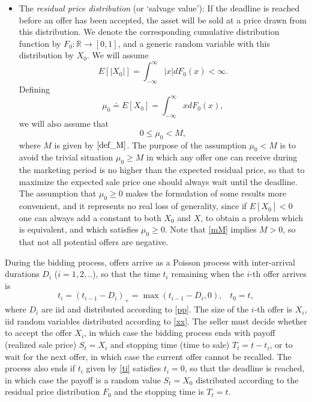 \documentclass{article}
\numberwithin{equation}{section}
\newcommand{\Real}{\mathbb{R}}
\begin{document}
\begin{itemize}
	\item The {\it{residual price distribution}} (or `salvage value'):
	If the deadline is reached before an offer has been accepted, the asset will be sold at a price drawn from this distribution. We denote the corresponding cumulative distribution function by 
	$F_0:\Real\rightarrow [0,1]$, and a generic random variable with this distribution by $X_0$. We will assume
	\begin{equation}\label{fm0} E[|X_0|]=\int_{-\infty}^\infty |x|dF_0(x)<\infty.
	\end{equation}
	Defining 
	\begin{equation}\label{def_mu0}\mu_0\doteq E[X_0]=\int_{-\infty}^\infty xdF_0(x),
	\end{equation}
	we will also assume that
	\begin{equation}\label{mM}0\leq \mu_0<M,\end{equation}
	where $M$ is given by $\eqref{def_M}$. 
	The purpose of the assumption $\mu_0<M$ is 
	to avoid the trivial situation
	$\mu_0\geq M$ in which any offer one can receive during the marketing period is no higher than the expected residual price, so that to maximize the expected sale price one should always wait until the deadline.
	The assumption that $\mu_0\geq 0$ makes the formulation of some results more convenient, and it represents no real loss of generality, since if $E[X_0]<0$ one can 
	always add a constant to both $X_0$ and $X$,
	to obtain a problem which is equivalent, and which satisfies $\mu_0\geq 0$. Note that \eqref{mM} implies $M>0$, so that not all potential offers are negative.
\end{itemize}

During the bidding process, offers arrive as
a Poisson process with inter-arrival durations
$D_i$ ($i=1,2,..$), so that the time $t_i$ remaining when the $i$-th offer arrives is 
\begin{equation}\label{ti}t_i=(t_{i-1}-D_i)_+=\max(t_{i-1}-D_i,0),\;\;\;t_0=t,\end{equation}
where $D_i$ are iid and distributed according to \eqref{pp}. The size of the $i$-th offer is $X_i$, iid random variables distributed according to \eqref{xx}. The seller must decide 
whether to accept the offer $X_i$, in which case
the bidding process ends with payoff (realized sale price) $S_t=X_i$ and stopping time (time to sale) $T_t=t-t_i$, or to wait for the next offer, in which case the current offer cannot be recalled. The process also ends
if $t_i$ given by \eqref{ti} satisfies $t_i= 0$, so that the deadline is reached,  in which case the payoff is a random value $S_t=X_0$ distributed according to the residual price distribution $F_0$ and the stopping time is $T_t=t$.
\end{document}
